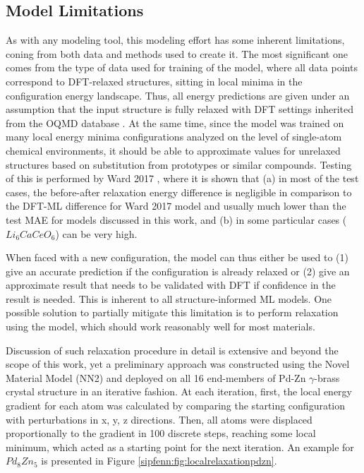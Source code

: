 \subsection{Model Limitations} \label{sipfenn:ssec:modellimitations}
As with any modeling tool, this modeling effort has some inherent limitations, coning from both data and methods used to create it. The most significant one comes from the type of data used for training of the model, where all data points correspond to DFT-relaxed structures, sitting in local minima in the configuration energy landscape. Thus, all energy predictions are given under an assumption that the input structure is fully relaxed with DFT settings inherited from the OQMD database \cite{Saal2013MaterialsOQMD}. At the same time, since the model was trained on many local energy minima configurations analyzed on the level of single-atom chemical environments, it should be able to approximate values for unrelaxed structures based on substitution from prototypes or similar compounds. Testing of this is performed by Ward 2017 \cite{Ward2017IncludingTessellations}, where it is shown that (a) in most of the test cases, the before-after relaxation energy difference is negligible in comparison to the DFT-ML difference for Ward 2017 model and usually much lower than the test MAE for models discussed in this work, and (b) in some particular cases ($Li_6CaCeO_6$) can be very high.

When faced with a new configuration, the model can thus either be used to (1) give an accurate prediction if the configuration is already relaxed or (2) give an approximate result that needs to be validated with DFT if confidence in the result is needed. This is inherent to all structure-informed ML models. One possible solution to partially mitigate this limitation is to perform relaxation using the model, which should work reasonably well for most materials. 

Discussion of such relaxation procedure in detail is extensive and beyond the scope of this work, yet a preliminary approach was constructed using the Novel Material Model (NN2) and deployed on all 16 end-members of Pd-Zn $\gamma$-brass crystal structure in an iterative fashion. At each iteration, first, the local energy gradient for each atom was calculated by comparing the starting configuration with perturbations in x, y, z directions. Then, all atoms were displaced proportionally to the gradient in 100 discrete steps, reaching some local minimum, which acted as a starting point for the next iteration. An example for $Pd_8Zn_5$ is presented in Figure \ref{sipfenn:fig:localrelaxationpdzn}.

